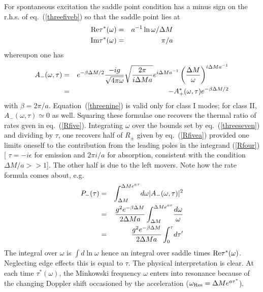 \documentclass[12pt,oneside]{report}
\def\om{\omega	}
\def\p {\prime}
\begin{document}
For spontaneous excitation the saddle point condition has a  minus sign
on the r.h.s. of eq.~(\ref{threefiveb}) so that the saddle point lies at
\begin{eqnarray}
{\rm Re} \tau^*(\om) &=&  a^{-1} \ln {\om / \Delta M}\nonumber\\
{\rm Im} \tau^*(\om) &=& \pi/a\label{threeeight}
\end{eqnarray}
whereupon  one has
\begin{eqnarray}
A_-(\om,\tau) &=& e^{- \beta \Delta M /2} {-i g \over \sqrt{4 \pi \om}}\sqrt{ 2
\pi \over i \Delta M a} e ^{ i \Delta M a^{-1}}
\left ( {\Delta M \over \om} \right)^{i \Delta M
a^{-1}} \nonumber\\
&=& - A^*_+(\om,\tau) e^{- \beta \Delta M /2}
\label{threenine}
\end{eqnarray}
with $\beta = 2 \pi / a$. Equation~(\ref{threenine}) is valid only for class I
modes; for class II, $A_-(\om,\tau)\simeq 0$ as well.  
Squaring these formulae one
recovers the thermal ratio of rates gven in eq.~(\ref{Rfive}). 
Integrating $\om$ over the
bounds set by eq.~(\ref{threeseven}) and dividing by $\tau$, one recovers half
of $R_\pm$ given by eq.~(\ref{Rfivea}) provided one limits oneself to the
contribution from the leading poles in the integrand (\ref{Rfour}) [ $\tau = -
i \epsilon$ for emission and $2 \pi i / a$ for absorption, consistent with the
condition $\Delta M / a >>1$]. The other half is due to the left movers. Note
how the rate formula comes about, e.g. 
\begin{eqnarray}
P_{-}(\tau)&=&\int_{\Delta M}^{\Delta M e^{a\tau}}\!d\om
\vert A_-(\om,\tau)\vert^2\nonumber\\
&=&{g^2 e^{-\beta \Delta M}
\over 2 \Delta M a}
\int_{\Delta M}^{\Delta M e^{a\tau}}\!{d\om\over \om}\nonumber\\
&=&{g^2 e^{-\beta \Delta M}
\over 2 \Delta M a}
\int_0^\tau \!d\tau^\p
\label{threenineb}
\end{eqnarray}
The integral over $\om$ is $\int d \ln \om$
hence an integral over saddle times ${\rm Re} \tau ^* (\om)$. Neglecting edge
effects this is equal to $\tau$. The physical interpretation is clear. At each
time $\tau^*(\om)$, the Minkowski frequency $\om$ enters into resonance because
of the changing Doppler shift occasioned by the acceleration ($\om_{\rm Res} =
\Delta M e^{a \tau^* }$).
\end{document}
